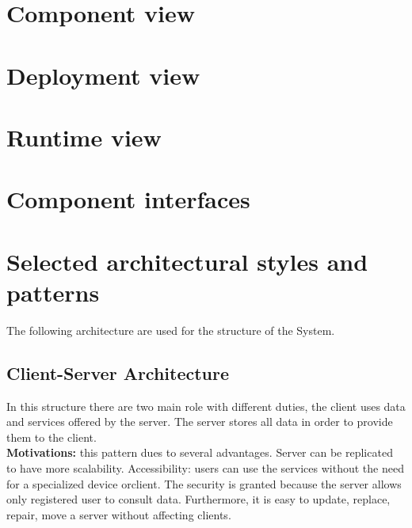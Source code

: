 \documentclass{report}
\begin{document}
\section{Component view}

\section{Deployment view}

\section{Runtime view}

\section{Component interfaces}

\section{Selected architectural	styles and patterns}
The following architecture are used for the structure of the System.
\subsection{Client-Server Architecture}
In this structure there are two main role with different duties, the client uses data and services offered by the server.
 The server stores all data in order to provide them to the client.\\
\textbf{Motivations:} this pattern dues to several advantages. Server can be replicated to have more scalability. 
Accessibility: users can use the services without the need for a specialized​ ​device​ ​or​ ​client.
The security is granted because the server allows only registered user to consult data.
Furthermore, it is easy to update, replace, repair, move a server without affecting clients.
\end{document}
